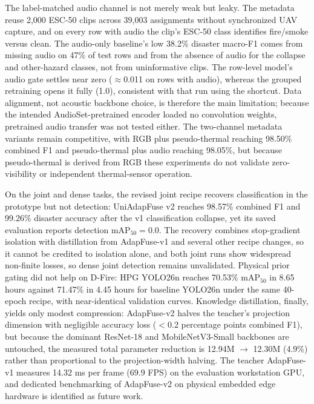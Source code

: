 The label-matched audio channel is not merely weak but leaky. The metadata reuse 2{,}000 ESC-50 clips across 39{,}003 assignments without synchronized UAV capture, and on every row with audio the clip's ESC-50 class identifies fire/smoke versus clean. The audio-only baseline's low 38.2\% disaster macro-F1 comes from missing audio on 47\% of test rows and from the absence of audio for the collapse and other-hazard classes, not from uninformative clips. The row-level model's audio gate settles near zero ($\approx$0.011 on rows with audio), whereas the grouped retraining opens it fully (1.0), consistent with that run using the shortcut. Data alignment, not acoustic backbone choice, is therefore the main limitation; because the intended AudioSet-pretrained encoder loaded no convolution weights, pretrained audio transfer was not tested either. The two-channel metadata variants remain competitive, with RGB plus pseudo-thermal reaching 98.50\% combined F1 and pseudo-thermal plus audio reaching 98.05\%, but because pseudo-thermal is derived from RGB these experiments do not validate zero-visibility or independent thermal-sensor operation.

On the joint and dense tasks, the revised joint recipe recovers classification in the prototype but not detection: UniAdapFuse v2 reaches 98.57\% combined F1 and 99.26\% disaster accuracy after the v1 classification collapse, yet its saved evaluation reports detection $\mathrm{mAP}_{50}=0.0$. The recovery combines stop-gradient isolation with distillation from AdapFuse-v1 and several other recipe changes, so it cannot be credited to isolation alone, and both joint runs show widespread non-finite losses, so dense joint detection remains unvalidated. Physical prior gating did not help on D-Fire: HPG YOLO26n reaches 70.53\% $\mathrm{mAP}_{50}$ in 8.65 hours against 71.47\% in 4.45 hours for baseline YOLO26n under the same 40-epoch recipe, with near-identical validation curves. Knowledge distillation, finally, yields only modest compression: AdapFuse-v2 halves the teacher's projection dimension with negligible accuracy loss ($<$0.2 percentage points combined F1), but because the dominant ResNet-18 and MobileNetV3-Small backbones are untouched, the measured total parameter reduction is 12.94M $\to$ 12.30M (4.9\%) rather than proportional to the projection-width halving. The teacher AdapFuse-v1 measures 14.32 ms per frame (69.9 FPS) on the evaluation workstation GPU, and dedicated benchmarking of AdapFuse-v2 on physical embedded edge hardware is identified as future work.

